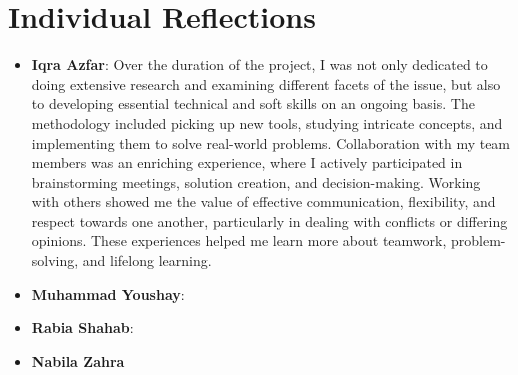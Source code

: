 \section{Individual Reflections}
\begin{itemize}
    \item \textbf{Iqra Azfar}: Over the duration of the project, I was not only dedicated to doing extensive research and examining different facets of the issue, but also to developing essential technical and soft skills on an ongoing basis. The methodology included picking up new tools, studying intricate concepts, and implementing them to solve real-world problems. Collaboration with my team members was an enriching experience, where I actively participated in brainstorming meetings, solution creation, and decision-making. Working with others showed me the value of effective communication, flexibility, and respect towards one another, particularly in dealing with conflicts or differing opinions. These experiences helped me learn more about teamwork, problem-solving, and lifelong learning.
    \item \textbf{Muhammad Youshay}:
    \item \textbf{Rabia Shahab}:
    \item \textbf{Nabila Zahra}
\end{itemize}

